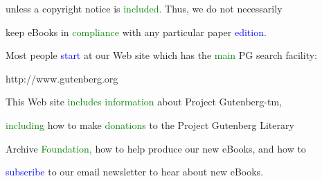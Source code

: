  unless a copyright notice is \textcolor{green}{included.} Thus, we do not necessarily

 keep eBooks in \textcolor{green}{compliance} with any particular paper \textcolor{blue}{edition.}





 Most people \textcolor{blue}{start} at our Web site which has the \textcolor{green}{main} PG search facility:



 http://www.gutenberg.org



 This Web site \textcolor{green}{includes} \textcolor{green}{information} about Project Gutenberg-tm,

 \textcolor{green}{including} how to make \textcolor{green}{donations} to the Project Gutenberg Literary

 Archive \textcolor{green}{Foundation,} how to help produce our new eBooks, and how to

 \textcolor{blue}{subscribe} to our email newsletter to hear about new eBooks.



